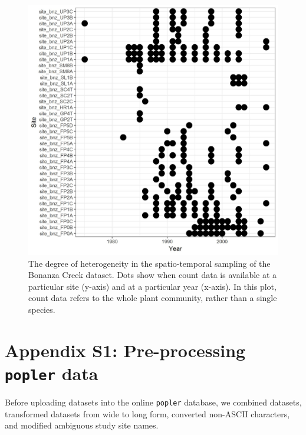 \documentclass{article}\usepackage[]{graphicx}\usepackage[]{color}
\begin{document}
\newpage
\begin{figure}[h!]
  \begin{center}
    \includegraphics[scale=0.8]{BNZ_rep}
    \caption{The degree of heterogeneity in the spatio-temporal sampling of the Bonanza Creek dataset. Dots show when count data is available at a particular site (y-axis) and at a particular year (x-axis). In this plot, count data refers to the whole plant community, rather than a single species.}
    \label{Fig:BNZ_rep}
  \end{center}
\end{figure}



\newpage

\section*{Appendix S1: Pre-processing \texttt{popler} data}
Before uploading datasets into the online \texttt{popler} database, we combined datasets, transformed datasets from wide to long form, converted non-ASCII characters, and modified ambiguous study site names.
\end{document}
